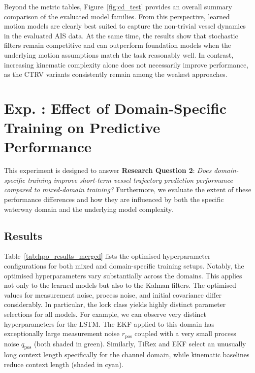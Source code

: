 Beyond the metric tables, Figure~\ref{fig:cd_test} provides an overall summary comparison of the evaluated model families.
From this perspective, learned motion models are clearly best suited to capture the non-trivial vessel dynamics in the evaluated AIS data.
At the same time, the results show that stochastic filters remain competitive and can outperform foundation models when the underlying motion assumptions match the task reasonably well.
In contrast, increasing kinematic complexity alone does not necessarily improve performance, as the CTRV variants consistently remain among the weakest approaches.





\section[Exp. \Romannum{2}: Domain-specific training]{Exp. : Effect of Domain-Specific Training on Predictive Performance}

This experiment is designed to answer \textbf{Research Question 2}: \textit{Does domain-specific training improve short-term vessel trajectory prediction performance compared to mixed-domain training?}
Furthermore, we evaluate the extent of these performance differences and how they are influenced by both the specific waterway domain and the underlying model complexity.
\subsection{Results}

Table~\ref{tab:hpo_results_merged} lists the optimised hyperparameter configurations for both mixed and domain-specific training setups.
Notably, the optimised hyperparameters vary substantially across the domains.
This applies not only to the learned models but also to the Kalman filters. The optimised values for measurement noise, process noise, and initial covariance differ considerably. %
In particular, the lock class yields highly distinct parameter selections for all models.
For example, we can observe very distinct hyperparameters for the \ac{LSTM}. The \ac{EKF} applied to this domain has exceptionally large measurement noise $r_\text{pos}$ coupled with a very small process noise $q_\text{pos}$ (both shaded in green). 
Similarly, TiRex and EKF select an unusually long context length specifically for the channel domain, while kinematic baselines reduce context length (shaded in cyan). %

